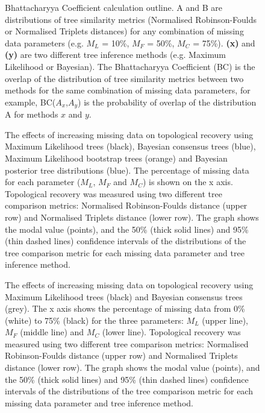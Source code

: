 \documentclass[12pt,letterpaper]{article}
\begin{document}
\begin{figure}
\caption{Bhattacharyya Coefficient calculation outline. A and B are distributions of tree similarity metrics (Normalised Robinson-Foulds or Normalised Triplets distances) for any combination of missing data parameters (e.g. $M_{L}$ = 10\%, $M_{F}$ = 50\%, $M_{C}$ = 75\%). \textbf{(x)} and \textbf{(y)} are two different tree inference methods (e.g. Maximum Likelihood or Bayesian). The Bhattacharyya Coefficient (BC) is the overlap of the distribution of tree similarity metrics between two methods for the same combination of missing data parameters, for example, BC($A_{x}$,$A_{y}$) is the probability of overlap of the distribution A for methods $x$ and $y$.}
\label{Fig_Bhattacharyya_Coefficients2} %
\end{figure}


\begin{figure}
\caption{The effects of increasing missing data on topological recovery using Maximum Likelihood trees (black), Bayesian consensus trees (blue), Maximum Likelihood bootstrap trees (orange) and Bayesian posterior tree distributions (blue). The percentage of missing data for each parameter ($M_{L}$, $M_{F}$ and $M_{C}$) is shown on the x axis. Topological recovery was measured using two different tree comparison metrics: Normalised Robinson-Foulds distance (upper row) and Normalised Triplets distance (lower row). The graph shows the modal value (points), and the 50\% (thick solid lines) and 95\% (thin dashed lines) confidence intervals of the distributions of the tree comparison metric for each missing data parameter and tree inference method.}
\label{Fig_Results-permeth_perparam} %
\end{figure}

\begin{figure}
\caption{The effects of increasing missing data on topological recovery using Maximum Likelihood trees (black) and Bayesian consensus trees (grey). The x axis shows the percentage of missing data from 0\% (white) to 75\% (black) for the three parameters: $M_{L}$ (upper line), $M_{F}$ (middle line) and $M_{C}$ (lower line). Topological recovery was measured using two different tree comparison metrics: Normalised Robinson-Foulds distance (upper row) and Normalised Triplets distance (lower row). The graph shows the modal value (points), and the 50\% (thick solid lines) and 95\% (thin dashed lines) confidence intervals of the distributions of the tree comparison metric for each missing data parameter and tree inference method.} 
\label{Fig_Results-global_perparam} %
\end{figure}
\end{document}

